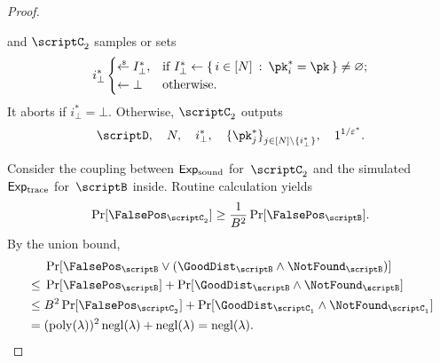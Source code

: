 \begin{proof}
\begin{itemize}
and $\scriptC_2$ samples or sets
\begin{align*}
i_\bot^\ast\begin{cases}
\draws I_\bot^\ast,&\textup{if }
I_\bot^\ast\gets
\{\,
{i\in[N]}
\::\:
{\pk_i^\ast=\pk}
\,\}\neq\varnothing;\\
\gets\bot&\textup{otherwise}.
\end{cases}
\end{align*}
It aborts if ${i_\bot^\ast=\bot}$.
Otherwise, $\scriptC_2$ outputs
\begin{align*}
\scriptD,\quad
N,\quad
i_\bot^\ast,\quad
\{\pk_j^\ast\}_{j\in{[N]\setminus{\{i_\bot^\ast\}}}}^\sphantom,\quad
1^{1/\epsilon^\ast}.
\end{align*}
\end{itemize}
Consider the coupling between $\ExpSound$ for~$\scriptC_2$
and the simulated $\ExpTrace$ for~$\scriptB$ inside.
Routine calculation yields
\begin{align*}
\Pr[\FalsePos_{\scriptC_2}]
\geq\frac{1}{B^2}\Pr[\FalsePos_\scriptB].
\end{align*}
By the union bound,
\begin{align*}
&
\Pr[\FalsePos_\scriptB\vee(\GoodDist_\scriptB\wedge\NotFound_\scriptB)]
\\{}\leq{}&
\Pr[\FalsePos_\scriptB]
+
\Pr[\GoodDist_\scriptB\wedge\NotFound_\scriptB]
\\{}\leq{}&
B^2\Pr[\FalsePos_{\scriptC_2}]
+
\Pr[\GoodDist_{\scriptC_1}\wedge\NotFound_{\scriptC_1}]
\WideNarrow{}{\hspace*{-1em}}
\\{}={}&
(\poly(\lambda))^2\negl(\lambda)+\negl(\lambda)
=
\negl(\lambda).
\qedhere
\end{align*}
\end{proof}
